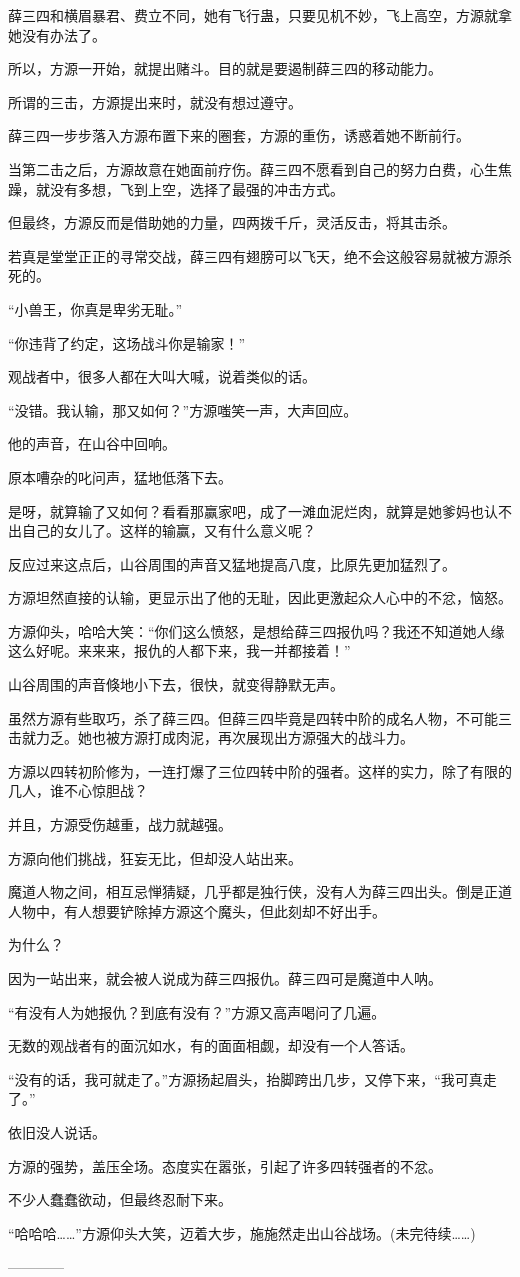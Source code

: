 \begin{this_body}
薛三四和横眉暴君、费立不同，她有飞行蛊，只要见机不妙，飞上高空，方源就拿她没有办法了。

所以，方源一开始，就提出赌斗。目的就是要遏制薛三四的移动能力。

所谓的三击，方源提出来时，就没有想过遵守。

薛三四一步步落入方源布置下来的圈套，方源的重伤，诱惑着她不断前行。

当第二击之后，方源故意在她面前疗伤。薛三四不愿看到自己的努力白费，心生焦躁，就没有多想，飞到上空，选择了最强的冲击方式。

但最终，方源反而是借助她的力量，四两拨千斤，灵活反击，将其击杀。

若真是堂堂正正的寻常交战，薛三四有翅膀可以飞天，绝不会这般容易就被方源杀死的。

“小兽王，你真是卑劣无耻。”

“你违背了约定，这场战斗你是输家！”

观战者中，很多人都在大叫大喊，说着类似的话。

“没错。我认输，那又如何？”方源嗤笑一声，大声回应。

他的声音，在山谷中回响。

原本嘈杂的叱问声，猛地低落下去。

是呀，就算输了又如何？看看那赢家吧，成了一滩血泥烂肉，就算是她爹妈也认不出自己的女儿了。这样的输赢，又有什么意义呢？

反应过来这点后，山谷周围的声音又猛地提高八度，比原先更加猛烈了。

方源坦然直接的认输，更显示出了他的无耻，因此更激起众人心中的不忿，恼怒。

方源仰头，哈哈大笑：“你们这么愤怒，是想给薛三四报仇吗？我还不知道她人缘这么好呢。来来来，报仇的人都下来，我一并都接着！”

山谷周围的声音倏地小下去，很快，就变得静默无声。

虽然方源有些取巧，杀了薛三四。但薛三四毕竟是四转中阶的成名人物，不可能三击就力乏。她也被方源打成肉泥，再次展现出方源强大的战斗力。

方源以四转初阶修为，一连打爆了三位四转中阶的强者。这样的实力，除了有限的几人，谁不心惊胆战？

并且，方源受伤越重，战力就越强。

方源向他们挑战，狂妄无比，但却没人站出来。

魔道人物之间，相互忌惮猜疑，几乎都是独行侠，没有人为薛三四出头。倒是正道人物中，有人想要铲除掉方源这个魔头，但此刻却不好出手。

为什么？

因为一站出来，就会被人说成为薛三四报仇。薛三四可是魔道中人呐。

“有没有人为她报仇？到底有没有？”方源又高声喝问了几遍。

无数的观战者有的面沉如水，有的面面相觑，却没有一个人答话。

“没有的话，我可就走了。”方源扬起眉头，抬脚跨出几步，又停下来，“我可真走了。”

依旧没人说话。

方源的强势，盖压全场。态度实在嚣张，引起了许多四转强者的不忿。

不少人蠢蠢欲动，但最终忍耐下来。

“哈哈哈……”方源仰头大笑，迈着大步，施施然走出山谷战场。(未完待续……)

------------

\end{this_body}

